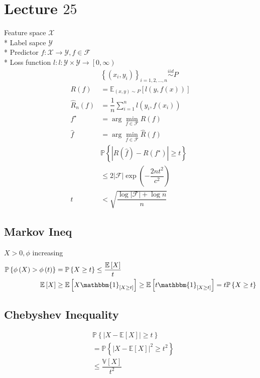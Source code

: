 \documentclass{article}
\begin{document}
\section{Lecture $25$} 
Feature space $\mathcal{X}$
\\* Label sapce $\mathcal{Y}$
\\* Predictor $f  : \mathcal{X} \to  \mathcal{Y}, f \in \mathcal{F}$
\\* Loss function $l  : l : \mathcal{Y} \times \mathcal{Y} \to  \left[0, \infty\right)$
\begin{align*}
&\left\{\left(x_{i}, y_{i}\right)\right\}_{i = 1, 2, ..., n} \stackrel{iid}{\sim} P 
\\ R\left(f\right)  &= \mathbb{E}_{\left(x, y\right) \sim  P}\left[l\left(y, f\left(x\right)\right)\right]
\\ \hat{R}_{n}\left(f\right) &= \dfrac{1}{n} \displaystyle\sum_{i=1}^{n} l\left(y_{i}, f\left(x_{i}\right)\right)
\\ f^\star  &= \arg\displaystyle\min_{f \in \mathcal{F}} R\left(f\right) 
\\ \hat{f} &= \arg\displaystyle\min_{f \in \mathcal{F}} \hat{R}\left(f\right)
\\ &  \mathbb{P}\left\{| R\left(\hat{f}\right) - R\left(f^\star \right) | \geq  t\right\}
\\ &\leq  2 | \mathcal{F} | \exp\left(- \dfrac{2 n t^{2}}{c^{2}}\right)
\\ t &< \sqrt{\dfrac{\log | \mathcal{F} | + \log n}{n}}
\end{align*}

\subsection{Markov Ineq}
$X  > 0, \phi$ increasing
\begin{align*}
\mathbb{P}\left\{\phi\left(X\right) > \phi\left(t\right)\right\} &= \mathbb{P}\left\{X \geq  t\right\} \leq  \dfrac{\mathbb{E}\left[X\right]}{t}
\\ \mathbb{E}\left[X\right] &\geq  \mathbb{E}\left[X \mathbbm{1}_{\left[X \geq  t\right]}\right] \geq  \mathbb{E}\left[t \mathbbm{1}_{\left[X \geq  t\right]}\right] = t \mathbb{P}\left\{X \geq  t\right\}
\end{align*}


\subsection{Chebyshev Inequality}
\begin{align*}
&  \mathbb{P}\left\{| X - \mathbb{E}\left[X\right] | \geq  t\right\}
\\ &= \mathbb{P}\left\{| X - \mathbb{E}\left[X\right] |^{2} \geq  t^{2}\right\}
\\ &\leq  \dfrac{\mathbb{V}\left[X\right]}{t^{2}}
\end{align*}
\end{document}
